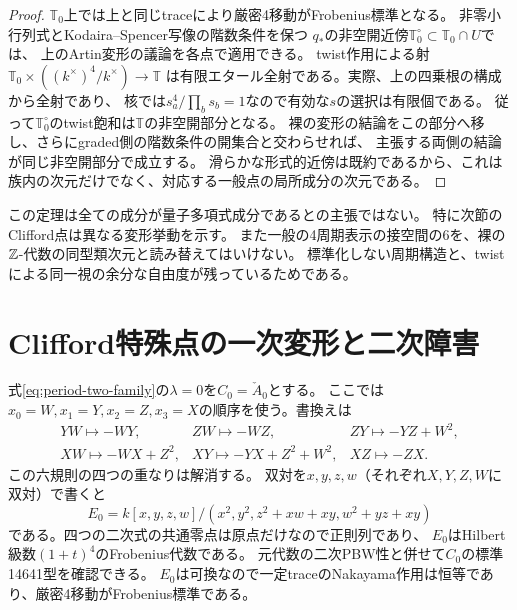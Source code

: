 \begin{proof}
$\mathbb T_0$上では上と同じtraceにより厳密4移動がFrobenius標準となる。
非零小行列式とKodaira--Spencer写像の階数条件を保つ
$q_*$の非空開近傍$\mathbb T_0^\circ\subset\mathbb T_0\cap U$では、
上のArtin変形の議論を各点で適用できる。
twist作用による射
$\mathbb T_0\times((k^\times)^4/k^\times)\to\mathbb T$
は有限エタール全射である。実際、上の四乗根の構成から全射であり、
核では$s_a^4/\prod_bs_b=1$なので有効な$s$の選択は有限個である。
従って$\mathbb T_0^\circ$のtwist飽和は$\mathbb T$の非空開部分となる。
裸の変形の結論をこの部分へ移し、さらにgraded側の階数条件の開集合と交わらせれば、
主張する両側の結論が同じ非空開部分で成立する。
滑らかな形式的近傍は既約であるから、これは族内の次元だけでなく、対応する一般点の局所成分の次元である。
\end{proof}

\begin{remark}
この定理は全ての成分が量子多項式成分であるとの主張ではない。
特に次節のClifford点は異なる変形挙動を示す。
また一般の4周期表示の接空間の6を、裸の$\mathbb Z$-代数の同型類次元と読み替えてはいけない。
標準化しない周期構造と、twistによる同一視の余分な自由度が残っているためである。
\end{remark}

\section{Clifford特殊点の一次変形と二次障害}\label{sec:clifford}
式\eqref{eq:period-two-family}の$\lambda=0$を$C_0=\check A_0$とする。
ここでは$x_0=W,x_1=Y,x_2=Z,x_3=X$の順序を使う。書換えは
\begin{equation}\label{eq:clifford-rules}
\begin{array}{lll}
YW\mapsto-WY,& ZW\mapsto-WZ,& ZY\mapsto-YZ+W^2,\\
XW\mapsto-WX+Z^2,& XY\mapsto-YX+Z^2+W^2,& XZ\mapsto-ZX.
\end{array}
\end{equation}
この六規則の四つの重なりは解消する。
双対を$x,y,z,w$（それぞれ$X,Y,Z,W$に双対）で書くと
\[
 E_0=k[x,y,z,w]/(x^2,y^2,z^2+xw+xy,w^2+yz+xy)
\]
である。四つの二次式の共通零点は原点だけなので正則列であり、
$E_0$はHilbert級数$(1+t)^4$のFrobenius代数である。
元代数の二次PBW性と併せて$C_0$の標準14641型を確認できる。
$E_0$は可換なので一定traceのNakayama作用は恒等であり、厳密4移動がFrobenius標準である。

